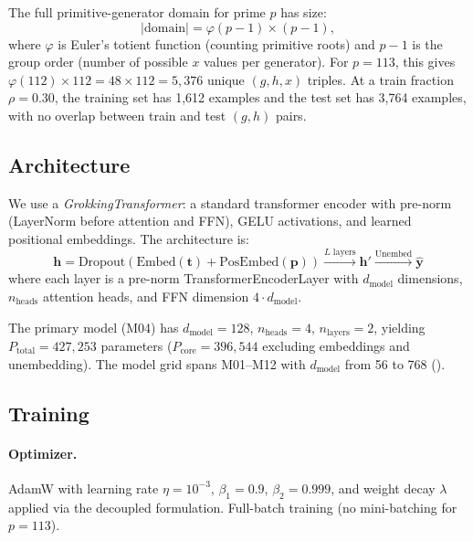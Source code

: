 \documentclass[11pt]{article}
\newcommand{\Pcore}{P_{\mathrm{core}}}
\newcommand{\Ptotal}{P_{\mathrm{total}}}
\newcommand{\dmodel}{d_{\mathrm{model}}}
\newcommand{\nheads}{n_{\mathrm{heads}}}
\newcommand{\nlayers}{n_{\mathrm{layers}}}
\begin{document}
The full primitive-generator domain for prime $p$ has size:
\begin{equation}
    |\text{domain}| = \varphi(p-1) \times (p - 1),
\end{equation}
where $\varphi$ is Euler's totient function (counting primitive roots) and $p - 1$ is the group order (number of possible $x$ values per generator). For $p = 113$, this gives $\varphi(112) \times 112 = 48 \times 112 = 5{,}376$ unique $(g, h, x)$ triples. At a train fraction $\rho = 0.30$, the training set has 1,612 examples and the test set has 3,764 examples, with no overlap between train and test $(g, h)$ pairs.

\subsection{Architecture}

We use a \emph{GrokkingTransformer}: a standard transformer encoder with pre-norm (LayerNorm before attention and FFN), GELU activations, and learned positional embeddings. The architecture is:
\begin{equation}
    \mathbf{h} = \mathrm{Dropout}(\mathrm{Embed}(\mathbf{t}) + \mathrm{PosEmbed}(\mathbf{p}))
    \xrightarrow{\text{$L$ layers}} \mathbf{h}'
    \xrightarrow{\text{Unembed}} \hat{\mathbf{y}}
\end{equation}
where each layer is a pre-norm TransformerEncoderLayer \citep{vaswani2017attention} with $\dmodel$ dimensions, $\nheads$ attention heads, and FFN dimension $4 \cdot \dmodel$.

The primary model (M04) has $\dmodel = 128$, $\nheads = 4$, $\nlayers = 2$, yielding $\Ptotal = 427{,}253$ parameters ($\Pcore = 396{,}544$ excluding embeddings and unembedding). The model grid spans M01--M12 with $\dmodel$ from 56 to 768 ().

\subsection{Training}

\paragraph{Optimizer.} AdamW \citep{loshchilov2019decoupled} with learning rate $\eta = 10^{-3}$, $\beta_1 = 0.9$, $\beta_2 = 0.999$, and weight decay $\lambda$ applied via the decoupled formulation. Full-batch training (no mini-batching for $p = 113$).
\end{document}
